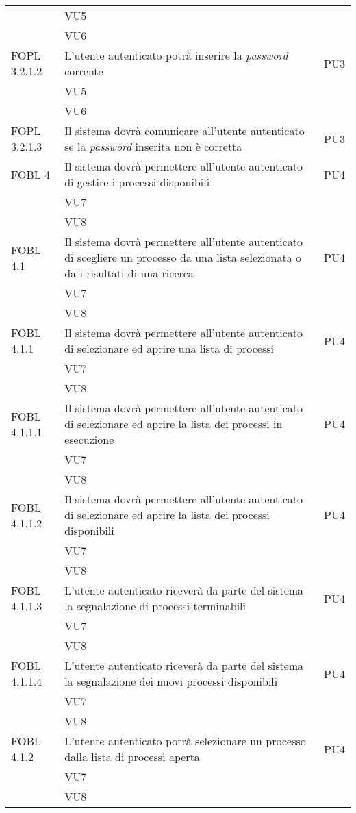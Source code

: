 \begin{longtable}{lXp{}}
&VU5\\ 
&VU6\\ 
\midrule 
FOPL 3.2.1.2&L'utente autenticato potrà inserire la \textit{password} corrente&PU3\\ 
&VU5\\ 
&VU6\\ 
\midrule 
FOPL 3.2.1.3&Il sistema dovrà comunicare all'utente autenticato se la \textit{password} inserita non è corretta&PU3\\ 
\midrule 
FOBL 4&Il sistema dovrà permettere all'utente autenticato di gestire i processi disponibili&PU4\\ 
&VU7\\ 
&VU8\\
\midrule
FOBL 4.1&Il sistema dovrà permettere all'utente autenticato di scegliere un processo da una lista selezionata o da i risultati di una ricerca&PU4\\ 
&VU7\\ 
&VU8\\ 
\midrule 
FOBL 4.1.1&Il sistema dovrà permettere all'utente autenticato di selezionare ed aprire una lista di processi&PU4\\ 
&VU7\\ 
&VU8\\ 
\midrule 
FOBL 4.1.1.1&Il sistema dovrà permettere all'utente autenticato di selezionare ed aprire la lista dei processi in esecuzione&PU4\\ 
&VU7\\ 
&VU8\\ 
\midrule 
FOBL 4.1.1.2&Il sistema dovrà permettere all'utente autenticato di selezionare ed aprire la lista dei processi disponibili&PU4\\ 
&VU7\\ 
&VU8\\ 
\midrule 
FOBL 4.1.1.3&L'utente autenticato riceverà da parte del sistema la segnalazione di processi terminabili&PU4\\ 
&VU7\\ 
&VU8\\ 
\midrule 
FOBL 4.1.1.4&L'utente autenticato riceverà da parte del sistema la segnalazione dei nuovi processi disponibili&PU4\\ 
&VU7\\ 
&VU8\\ 
\midrule 
FOBL 4.1.2&L'utente autenticato potrà selezionare un processo dalla lista di processi aperta&PU4\\ 
&VU7\\ 
&VU8\\ 

\end{longtable}
